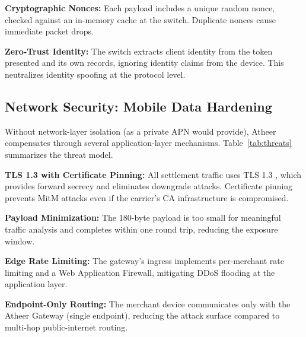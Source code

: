\documentclass[conference,10pt]{IEEEtran}
\begin{document}
\textbf{Cryptographic Nonces:} Each payload includes a unique random nonce, checked against an in-memory cache at the switch. Duplicate nonces cause immediate packet drops.

\textbf{Zero-Trust Identity:} The switch extracts client identity from the token presented and its own records, ignoring identity claims from the device. This neutralizes identity spoofing at the protocol level.

\subsection{Network Security: Mobile Data Hardening}

Without network-layer isolation (as a private APN would provide), Atheer compensates through several application-layer mechanisms. Table~\ref{tab:threats} summarizes the threat model.

\textbf{TLS 1.3 with Certificate Pinning:} All settlement traffic uses TLS 1.3 \cite{rfc8446}, which provides forward secrecy and eliminates downgrade attacks. Certificate pinning prevents MitM attacks even if the carrier's CA infrastructure is compromised.

\textbf{Payload Minimization:} The 180-byte payload is too small for meaningful traffic analysis and completes within one round trip, reducing the exposure window.

\textbf{Edge Rate Limiting:} The gateway's ingress implements per-merchant rate limiting and a Web Application Firewall, mitigating DDoS flooding at the application layer.

\textbf{Endpoint-Only Routing:} The merchant device communicates only with the Atheer Gateway (single endpoint), reducing the attack surface compared to multi-hop public-internet routing.
\end{document}
